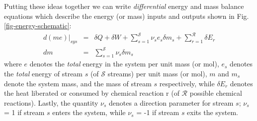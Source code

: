 \documentclass[11pt]{article}
\theoremstyle{definition}
\begin{document}
Putting these ideas together we can write \textit{differential} energy and mass balance equations which describe the energy (or mass) inputs and outputs shown in Fig. \ref{fig-energy-schematic}:
\begin{eqnarray}\label{eqn:energy-balance-precursor}
d\left(me\right)\Bigr|_{sys} &=& \delta{Q}+\delta{W}+\sum_{s=1}^{\mathcal{S}}\nu_{s}e_{s}\delta{m}_{s} + \sum_{r=1}^{\mathcal{R}}\delta E_{r}\\\label{eqn:material-balance-precursor}
dm &=& \sum_{s=1}^{\mathcal{S}}\nu_{s}\delta{m}_{s}
\end{eqnarray}where $e$ denotes the \textit{total} energy in the system per unit mass (or mol), $e_{s}$ denotes the \textit{total} energy of stream $s$ (of $\mathcal{S}$ streams) per unit mass (or mol),
$m$ and $m_{s}$ denote the system mass, and the mass of stream $s$ respectively, while $\delta E_{r}$ denotes the heat liberated or consumed by chemical reaction r (of $\mathcal{R}$ possible chemical reactions).
Lastly, the quantity $\nu_{s}$ denotes a direction parameter for stream $s$; $\nu_{s}$ = 1 if stream $s$ enters the system, while $\nu_{s}$ = -1 if stream $s$ exits the system.
\end{document}
